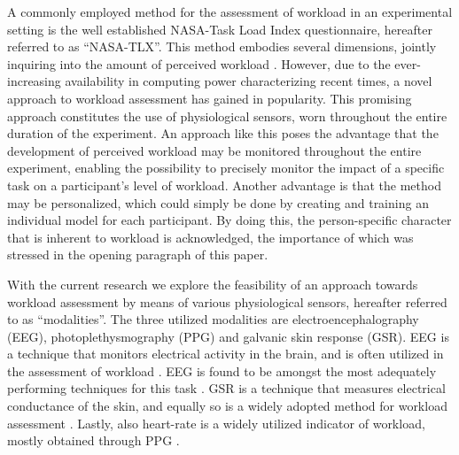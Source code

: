 \documentclass[fleqn,11pt]{paper}
\begin{document}
A commonly employed method for the assessment of workload in an experimental setting is the well established NASA-Task Load Index questionnaire, hereafter referred to as \enquote{NASA-TLX}. This method embodies several dimensions, jointly inquiring into the amount of perceived workload \cite{hart2006nasa}. However, due to the ever-increasing availability in computing power characterizing recent times, a novel approach to workload assessment has gained in popularity. This promising approach constitutes the use of physiological sensors, worn throughout the entire duration of the experiment. An approach like this poses the advantage that the development of perceived workload may be monitored throughout the entire experiment, enabling the possibility to precisely monitor the impact of a specific task on a participant's level of workload. Another advantage is that the method may be personalized, which could simply be done by creating and training an individual model for each participant. By doing this, the person-specific character that is inherent to workload is acknowledged, the importance of which was stressed in the opening paragraph of this paper. 

With the current research we explore the feasibility of an approach towards workload assessment by means of various physiological sensors, hereafter referred to as \enquote{modalities}. The three utilized modalities are electroencephalography (EEG), photoplethysmography (PPG) and galvanic skin response (GSR). EEG is a technique that monitors electrical activity in the brain, and is often utilized in the assessment of workload \cite{berka2005evaluation, craik2019deep}. EEG is found to be amongst the most adequately performing techniques for this task \cite{hogervorst2014combining}. GSR is a technique that measures electrical conductance of the skin, and equally so is a widely adopted method for workload assessment \cite{nourbakhsh2012using, zhou2015dynamic}. Lastly, also heart-rate is a widely utilized indicator of workload, mostly obtained through PPG \cite{zhang2018evaluating,jimenez2018using}. 
\end{document}
